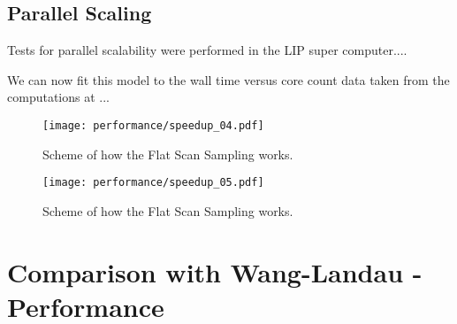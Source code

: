 \subsection{Parallel Scaling}

	Tests for parallel scalability were performed in the LIP super computer.... 
	

	We can now fit this model to the wall time versus core count data taken from the computations at ...


\begin{figure}[h]
	\centering
	\texttt{[image: performance/speedup\_04.pdf]}
	\caption{Scheme of how the Flat Scan Sampling works.}
\end{figure}

\begin{figure}[h]
	\centering
	\texttt{[image: performance/speedup\_05.pdf]}
	\caption{Scheme of how the Flat Scan Sampling works.}
\end{figure}


\section{Comparison with Wang-Landau - Performance}





